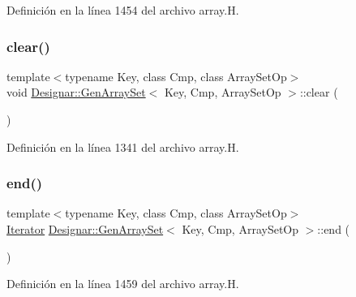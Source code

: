 Definición en la línea 1454 del archivo array.\+H.

\mbox{\label{class_designar_1_1_gen_array_set_aa1b1d249debb38432e56b2e585d822af}} 
\subsubsection{\texorpdfstring{clear()}{clear()}}
{\footnotesize\ttfamily template$<$typename Key, class Cmp, class Array\+Set\+Op$>$ \\
void \hyperlink{class_designar_1_1_gen_array_set}{Designar\+::\+Gen\+Array\+Set}$<$ Key, Cmp, Array\+Set\+Op $>$\+::clear (\begin{DoxyParamCaption}{ }\end{DoxyParamCaption})\hspace{0.3cm}{\ttfamily [inline]}}



Definición en la línea 1341 del archivo array.\+H.

\mbox{\label{class_designar_1_1_gen_array_set_a23644b099a1bf858784e474d833245a8}} 
\subsubsection{\texorpdfstring{end()}{end()}\hspace{0.1cm}{\footnotesize\ttfamily [1/2]}}
{\footnotesize\ttfamily template$<$typename Key, class Cmp, class Array\+Set\+Op$>$ \\
\hyperlink{class_designar_1_1_gen_array_set_1_1_iterator}{Iterator} \hyperlink{class_designar_1_1_gen_array_set}{Designar\+::\+Gen\+Array\+Set}$<$ Key, Cmp, Array\+Set\+Op $>$\+::end (\begin{DoxyParamCaption}{ }\end{DoxyParamCaption})\hspace{0.3cm}{\ttfamily [inline]}}



Definición en la línea 1459 del archivo array.\+H.

\mbox{\label{class_designar_1_1_gen_array_set_ade46fb4605ffb1e08d6475a7aacd6024}} 
